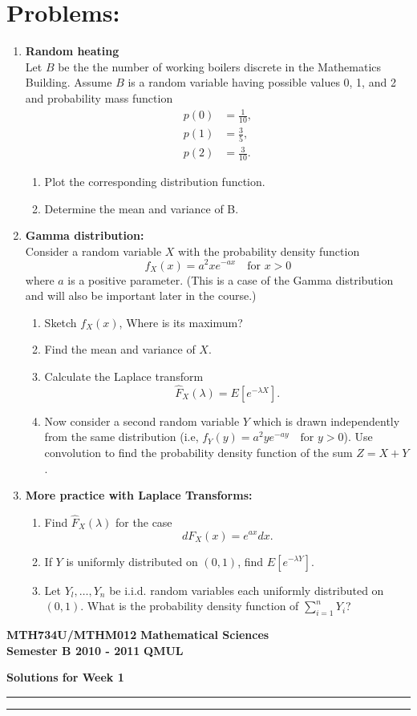 \documentclass[11pt,a4paper]{article}
\begin{document}
  \section*{Problems:}
  \begin{enumerate}
    \item \textbf{Random heating}\\
    Let $B$ be the the number of working boilers discrete in the Mathematics Building. Assume $B$ is a random variable having possible values 0, 1, and 2 and probability mass function
    \begin{align*}
      p(0) &= \frac{1}{10},\\
      p(1) &= \frac{3}{5},\\
      p(2) &= \frac{3}{10}.
    \end{align*}
    \begin{enumerate}
      \item Plot the corresponding distribution function.
      \item Determine the mean and variance of B.
    \end{enumerate}
    \item \textbf{Gamma distribution:}\\
    Consider a random variable $X$ with the probability density function
    $$
    f_X(x) = a^2xe^{-ax} \quad \text{for $x > 0$}
    $$
    where $a$ is a positive parameter. (This is a case of the Gamma distribution and will also be important later in the course.)
    \begin{enumerate}
      \item Sketch $f_X(x)$, Where is its maximum?
      \item Find the mean and variance of $X$.
      \item Calculate the Laplace transform
      $$
        \hat{F}_X(\lambda) = E[e^{-\lambda X}].
      $$
      \item Now consider a second random variable $Y$ which is drawn independently from the same distribution (i.e, $f_Y(y) = a^2ye^{-ay} \quad \text{for $y > 0$}$). Use convolution to find the probability density function of the sum $Z = X + Y$.
    \end{enumerate}
    \item \textbf{More practice with Laplace Transforms:}
    \begin{enumerate}
      \item Find $\hat{F}_X(\lambda)$ for the case $$dF_X(x) = e^{ax}dx.$$
      \item If $Y$ is uniformly distributed on $(0, 1)$, find $E[e^{-\lambda Y}]$.
      \item Let $Y_l,\ldots, Y_n$ be i.i.d. random variables each uniformly distributed on $(0, 1)$. What is the
      probability density function of $\sum_{i=1}^{n}Y_i$?
    \end{enumerate}
  \end{enumerate}
  \newpage
  \textbf{MTH734U/MTHM012} \hfill \textbf{Mathematical Sciences}\\
  \textbf{Semester B 2010 - 2011} \hfill \textbf{QMUL}
  \begin{center}
    \textbf{\Huge Solutions for Week 1}
  \end{center}
  \hrule \vspace{2mm} \hrule
\end{document}
